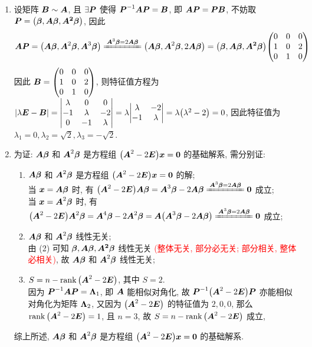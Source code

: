 \begin{solution}
\begin{enumerate}[label=(\arabic{*})]
        \item 设矩阵 $\vb*{B}\sim\vb*{A}$, 且 $\exists\vb*{P}$ 使得 $\vb*{P}^{-1}\vb*{AP}=\vb*{B}$, 即 $\vb*{AP}=\vb*{PB}$, 不妨取 $\vb*{P}=\qty(\vb*{\beta},\vb*{A\beta},\vb*{A^2\beta})$, 因此
              $$\vb*{AP}=\qty(\vb*{A\beta},\vb*{A}^2\vb*{\beta},\vb*{A}^3\vb*{\beta})\xlongequal{\vb*{A}^3\vb*{\beta}=2\vb*{A\beta}}\qty(\vb*{A\beta},\vb*{A}^2\vb*{\beta},2\vb*{A\beta})=\qty(\vb*{\beta},\vb*{A\beta},\vb*{A^2\beta})\mqty(0&0&0\\1&0&2\\0&1&0)$$
              因此 $\vb*{B}=\mqty(0&0&0\\1&0&2\\0&1&0)$, 则特征值方程为 $|\lambda\vb*{E}-\vb*{B}|=\mqty|\lambda &0&0\\-1&\lambda&-2\\0&-1&\lambda|=\lambda\mqty|\lambda&-2\\-1&\lambda|=\lambda\qty(\lambda^2-2)=0$, 因此特征值为 $\lambda_1=0,\lambda_2=\sqrt{2},\lambda_3=-\sqrt{2}$.
        \item 为证: $\vb*{A\beta}$ 和 $\vb*{A}^2\vb*{\beta}$ 是方程组 $\qty(\vb*{A}^2-2\vb*{E})\vb*{x}=\vb*{0}$ 的基础解系, 需分别证:
              \begin{enumerate}[label=(\roman{*})]
                  \item $\vb*{A\beta}$ 和 $\vb*{A}^2\vb*{\beta}$ 是方程组 $\qty(\vb*{A}^2-2\vb*{E})\vb*{x}=\vb*{0}$ 的解;\\
                        当 $\vb*{x}=\vb*{A\beta}$ 时, 有 $\qty(\vb*{A}^2-2\vb*{E})\vb*{A\beta}=\vb*{A}^3\vb*{\beta}-2\vb*{A\beta}\xlongequal{\vb*{A}^3\vb*{\beta}=2\vb*{A\beta}}\vb*{0}$ 成立;\\
                        当 $\vb*{x}=\vb*{A}^2\vb*{\beta}$ 时, 有 $\qty(\vb*{A}^2-2\vb*{E})\vb*{A}^2\vb*{\beta}=\vb*{A}^4\vb*{\beta}-2\vb*{A}^2\vb*{\beta}=\vb*{A}\qty(\vb*{A}^3\vb*{\beta}-2\vb*{A\beta})\xlongequal{\vb*{A}^3\vb*{\beta}=2\vb*{A\beta}}\vb*{0}$ 成立;
                  \item $\vb*{A\beta}$ 和 $\vb*{A}^2\vb*{\beta}$ 线性无关;\\
                        由 (2) 可知 $\vb*{\beta},\vb*{A\beta},\vb*{A^2\beta}$ 线性无关 \textcolor{red}{(整体无关, 部分必无关; 部分相关, 整体必相关)}, 故 $\vb*{A\beta}$ 和 $\vb*{A}^2\vb*{\beta}$ 线性无关;
                  \item $S=n-\rank\qty(\vb*{A}^2-2\vb*{E})$, 其中 $S=2$.\\
                        因为 $\vb*{P}^{-1}\vb*{AP}=\vb*{\Lambda}_1$, 即 $\vb*{A}$ 能相似对角化, 故 $\vb*{P}^{-1}\qty(\vb*{A}^2-2\vb*{E})\vb*{P}$ 亦能相似对角化为矩阵 $\vb*{\Lambda}_2$, 又因为 $\qty(\vb*{A}^2-2\vb*{E})$ 的特征值为 $2,0,0$, 那么 $\rank\qty(\vb*{A}^2-2\vb*{E})=1$, 且 $n=3$, 故 $S=n-\rank\qty(\vb*{A}^2-2\vb*{E})$ 成立, 
              \end{enumerate}
              综上所述, $\vb*{A\beta}$ 和 $\vb*{A}^2\vb*{\beta}$ 是方程组 $\qty(\vb*{A}^2-2\vb*{E})\vb*{x}=\vb*{0}$ 的基础解系.
    \end{enumerate}
\end{solution}

